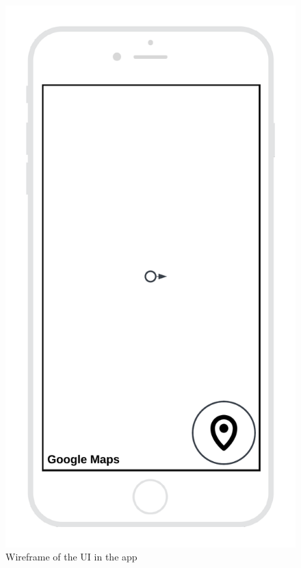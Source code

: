 \documentclass{article}
\begin{document}
\begin{figure}[H]
    \centering
    \includegraphics[scale=0.12]{graphics/wireframe_app.png}
    \caption{Wireframe of the UI in the app}
    \label{fig:wireframe_app}
\end{figure}


\newpage
\end{document}
